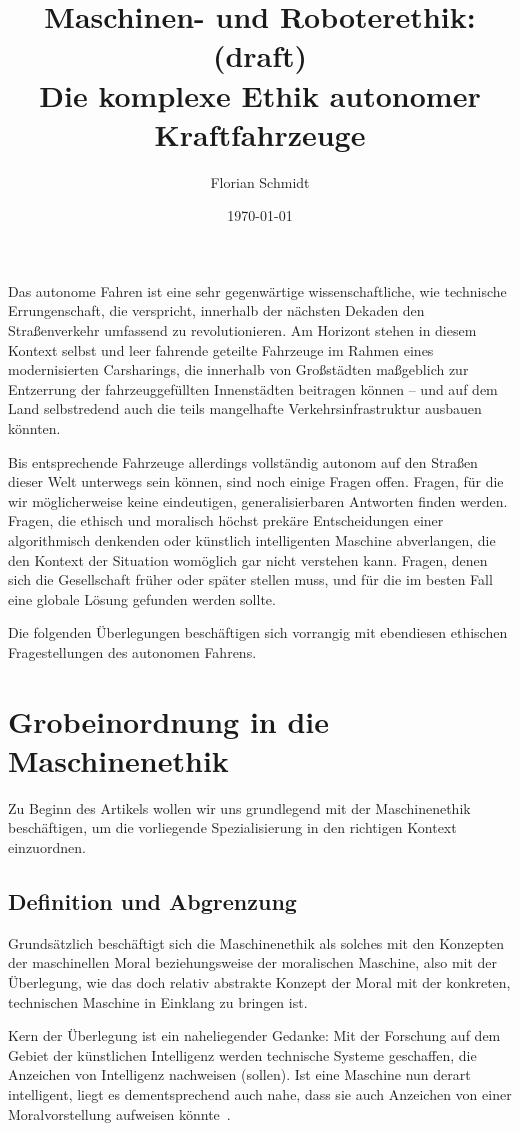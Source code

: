 \documentclass[twocolumn, german]{tum-article}
\title{{\color{TUMBlau} Maschinen- und Roboterethik:} {\color{red} (draft)}\\Die komplexe Ethik autonomer Kraftfahrzeuge}
\author{Florian Schmidt\authormark{1, \,\Letter}}
\affil[1]{Fakultät für Informatik, Technische Universität München (TUM),
  Boltzmannstr. 3, 85748 Garching, Deutschland}
\date{\today}
\begin{document}
\maketitle

Das autonome Fahren ist eine sehr gegenwärtige wissenschaftliche, wie technische Errungenschaft, die verspricht, innerhalb der nächsten Dekaden den Straßenverkehr umfassend zu revolutionieren.
Am Horizont stehen in diesem Kontext selbst und leer fahrende geteilte Fahrzeuge im Rahmen eines modernisierten Carsharings, die innerhalb von Großstädten maßgeblich zur Entzerrung der fahrzeuggefüllten Innenstädten beitragen können -- und auf dem Land selbstredend auch die teils mangelhafte Verkehrsinfrastruktur ausbauen könnten.

Bis entsprechende Fahrzeuge allerdings vollständig autonom auf den Straßen dieser Welt unterwegs sein können, sind noch einige Fragen offen.
Fragen, für die wir möglicherweise keine eindeutigen, generalisierbaren Antworten finden werden.
Fragen, die ethisch und moralisch höchst prekäre Entscheidungen einer algorithmisch denkenden oder künstlich intelligenten Maschine abverlangen, die den Kontext der Situation womöglich gar nicht verstehen kann.
Fragen, denen sich die Gesellschaft früher oder später stellen muss, und für die im besten Fall eine globale Lösung gefunden werden sollte.

Die folgenden Überlegungen beschäftigen sich vorrangig mit ebendiesen ethischen Fragestellungen des autonomen Fahrens.


\section{Grobeinordnung in die Maschinenethik}
Zu Beginn des Artikels wollen wir uns grundlegend mit der Maschinenethik beschäftigen, um die vorliegende Spezialisierung in den richtigen Kontext einzuordnen.


\subsection{Definition und Abgrenzung}
Grundsätzlich beschäftigt sich die Maschinenethik als solches mit den Konzepten der maschinellen Moral beziehungsweise der moralischen Maschine, also mit der Überlegung, wie das doch relativ abstrakte Konzept der Moral mit der konkreten, technischen Maschine in Einklang zu bringen ist.

Kern der Überlegung ist ein naheliegender Gedanke: Mit der Forschung auf dem Gebiet der künstlichen Intelligenz werden technische Systeme geschaffen, die Anzeichen von Intelligenz nachweisen (sollen).
Ist eine Maschine nun derart intelligent, liegt es dementsprechend auch nahe, dass sie auch Anzeichen von einer Moralvorstellung aufweisen könnte~\cite[S. 3f.]{bendel-mascheth}.
\end{document}
